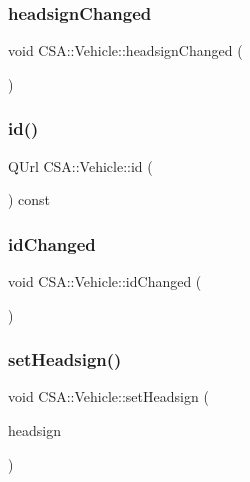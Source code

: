 \subsubsection{\texorpdfstring{headsign\+Changed}{headsignChanged}}
{\footnotesize\ttfamily void C\+S\+A\+::\+Vehicle\+::headsign\+Changed (\begin{DoxyParamCaption}{ }\end{DoxyParamCaption})\hspace{0.3cm}{\ttfamily [signal]}}

\mbox{\label{classCSA_1_1Vehicle_a99b2869ea0bee81d0bff5e32259146e6}} 
\subsubsection{\texorpdfstring{id()}{id()}}
{\footnotesize\ttfamily Q\+Url C\+S\+A\+::\+Vehicle\+::id (\begin{DoxyParamCaption}{ }\end{DoxyParamCaption}) const}

\mbox{\label{classCSA_1_1Vehicle_a4db7ec27aa6ef10cf09ac41cfabd2642}} 
\subsubsection{\texorpdfstring{id\+Changed}{idChanged}}
{\footnotesize\ttfamily void C\+S\+A\+::\+Vehicle\+::id\+Changed (\begin{DoxyParamCaption}{ }\end{DoxyParamCaption})\hspace{0.3cm}{\ttfamily [signal]}}

\mbox{\label{classCSA_1_1Vehicle_ab47b72449154d72055cf506b6fc9a90a}} 
\subsubsection{\texorpdfstring{set\+Headsign()}{setHeadsign()}}
{\footnotesize\ttfamily void C\+S\+A\+::\+Vehicle\+::set\+Headsign (\begin{DoxyParamCaption}\item[{const Q\+String \&}]{headsign }\end{DoxyParamCaption})}

